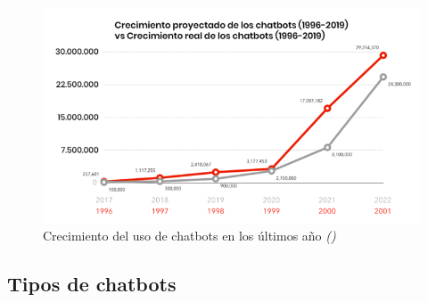 \begin{figure}[!ht]
    \centering
    \includegraphics[width=1\textwidth]{imagenes/uso_chatbots.png}
    \caption{ Crecimiento del uso de chatbots en los últimos año \textit{(\cite{crecimientochatbots})} }
    \label{fig:enter-label}
\end{figure}

\subsection{Tipos de chatbots}

